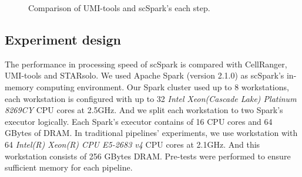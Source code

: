 \documentclass[conference]{IEEEtran}
\begin{document}
\begin{figure}
	\centering
	\caption{Comparison of UMI-tools and scSpark's each step.}
	\label{fig2}
\end{figure}

\subsection{Experiment design}
The performance in processing speed of scSpark is compared with CellRanger, UMI-tools and STARsolo. 
We used Apache Spark (version 2.1.0) as scSpark's in-memory computing environment.
Our Spark cluster used up to 8 workstations, each workstation is configured with up to 32 \textit{Intel Xeon(Cascade Lake) Platinum 8269CY} CPU cores at 2.5GHz.
And we split each workstation to two Spark's executor logically.
Each Spark's executor contains of 16 CPU cores and 64 GBytes of DRAM.
In traditional pipelines' experiments, we use workstation with 64 \textit{Intel(R) Xeon(R) CPU E5-2683 v4} CPU cores at 2.1GHz.
And this workstation consists of 256 GBytes DRAM.
Pre-tests were performed to ensure sufficient memory for each pipeline.
\end{document}
